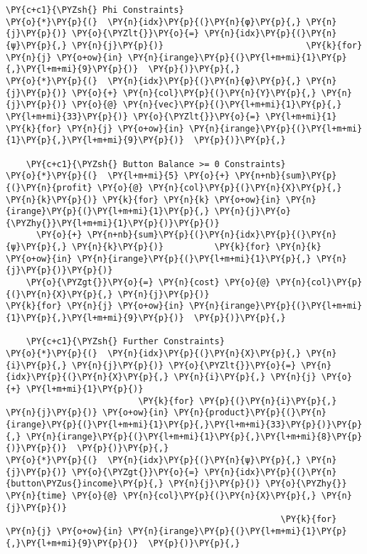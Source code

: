 \begin{tcolorbox}[breakable, size=fbox, boxrule=1pt, pad at break*=1mm,colback=cellbackground, colframe=cellborder]
\begin{Verbatim}[commandchars=\\\{\}]
    \PY{c+c1}{\PYZsh{} Phi Constraints}
\PY{o}{*}\PY{p}{(}  \PY{n}{idx}\PY{p}{(}\PY{n}{φ}\PY{p}{,} \PY{n}{j}\PY{p}{)} \PY{o}{\PYZlt{}}\PY{o}{=} \PY{n}{idx}\PY{p}{(}\PY{n}{ψ}\PY{p}{,} \PY{n}{j}\PY{p}{)}                            \PY{k}{for} \PY{n}{j} \PY{o+ow}{in} \PY{n}{irange}\PY{p}{(}\PY{l+m+mi}{1}\PY{p}{,}\PY{l+m+mi}{9}\PY{p}{)}  \PY{p}{)}\PY{p}{,}
\PY{o}{*}\PY{p}{(}  \PY{n}{idx}\PY{p}{(}\PY{n}{φ}\PY{p}{,} \PY{n}{j}\PY{p}{)} \PY{o}{+} \PY{n}{col}\PY{p}{(}\PY{n}{Y}\PY{p}{,} \PY{n}{j}\PY{p}{)} \PY{o}{@} \PY{n}{vec}\PY{p}{(}\PY{l+m+mi}{1}\PY{p}{,} \PY{l+m+mi}{33}\PY{p}{)} \PY{o}{\PYZlt{}}\PY{o}{=} \PY{l+m+mi}{1}           \PY{k}{for} \PY{n}{j} \PY{o+ow}{in} \PY{n}{irange}\PY{p}{(}\PY{l+m+mi}{1}\PY{p}{,}\PY{l+m+mi}{9}\PY{p}{)}  \PY{p}{)}\PY{p}{,}

    \PY{c+c1}{\PYZsh{} Button Balance >= 0 Constraints}
\PY{o}{*}\PY{p}{(}  \PY{l+m+mi}{5} \PY{o}{+} \PY{n+nb}{sum}\PY{p}{(}\PY{n}{profit} \PY{o}{@} \PY{n}{col}\PY{p}{(}\PY{n}{X}\PY{p}{,} \PY{n}{k}\PY{p}{)} \PY{k}{for} \PY{n}{k} \PY{o+ow}{in} \PY{n}{irange}\PY{p}{(}\PY{l+m+mi}{1}\PY{p}{,} \PY{n}{j}\PY{o}{\PYZhy{}}\PY{l+m+mi}{1}\PY{p}{)}\PY{p}{)}
      \PY{o}{+} \PY{n+nb}{sum}\PY{p}{(}\PY{n}{idx}\PY{p}{(}\PY{n}{ψ}\PY{p}{,} \PY{n}{k}\PY{p}{)}          \PY{k}{for} \PY{n}{k} \PY{o+ow}{in} \PY{n}{irange}\PY{p}{(}\PY{l+m+mi}{1}\PY{p}{,} \PY{n}{j}\PY{p}{)}\PY{p}{)}
    \PY{o}{\PYZgt{}}\PY{o}{=} \PY{n}{cost} \PY{o}{@} \PY{n}{col}\PY{p}{(}\PY{n}{X}\PY{p}{,} \PY{n}{j}\PY{p}{)}                               \PY{k}{for} \PY{n}{j} \PY{o+ow}{in} \PY{n}{irange}\PY{p}{(}\PY{l+m+mi}{1}\PY{p}{,}\PY{l+m+mi}{9}\PY{p}{)}  \PY{p}{)}\PY{p}{,}

    \PY{c+c1}{\PYZsh{} Further Constraints}
\PY{o}{*}\PY{p}{(}  \PY{n}{idx}\PY{p}{(}\PY{n}{X}\PY{p}{,} \PY{n}{i}\PY{p}{,} \PY{n}{j}\PY{p}{)} \PY{o}{\PYZlt{}}\PY{o}{=} \PY{n}{idx}\PY{p}{(}\PY{n}{X}\PY{p}{,} \PY{n}{i}\PY{p}{,} \PY{n}{j} \PY{o}{+} \PY{l+m+mi}{1}\PY{p}{)}
                          \PY{k}{for} \PY{p}{(}\PY{n}{i}\PY{p}{,} \PY{n}{j}\PY{p}{)} \PY{o+ow}{in} \PY{n}{product}\PY{p}{(}\PY{n}{irange}\PY{p}{(}\PY{l+m+mi}{1}\PY{p}{,}\PY{l+m+mi}{33}\PY{p}{)}\PY{p}{,} \PY{n}{irange}\PY{p}{(}\PY{l+m+mi}{1}\PY{p}{,}\PY{l+m+mi}{8}\PY{p}{)}\PY{p}{)}  \PY{p}{)}\PY{p}{,}
\PY{o}{*}\PY{p}{(}  \PY{n}{idx}\PY{p}{(}\PY{n}{ψ}\PY{p}{,} \PY{n}{j}\PY{p}{)} \PY{o}{\PYZgt{}}\PY{o}{=} \PY{n}{idx}\PY{p}{(}\PY{n}{button\PYZus{}income}\PY{p}{,} \PY{n}{j}\PY{p}{)} \PY{o}{\PYZhy{}} \PY{n}{time} \PY{o}{@} \PY{n}{col}\PY{p}{(}\PY{n}{X}\PY{p}{,} \PY{n}{j}\PY{p}{)}
                                                      \PY{k}{for} \PY{n}{j} \PY{o+ow}{in} \PY{n}{irange}\PY{p}{(}\PY{l+m+mi}{1}\PY{p}{,}\PY{l+m+mi}{9}\PY{p}{)}  \PY{p}{)}\PY{p}{,}


\end{Verbatim}
\end{tcolorbox}

